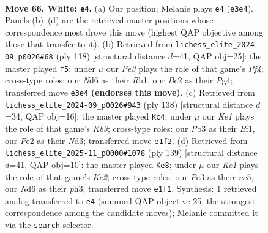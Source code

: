\documentclass[11pt]{article}
\begin{document}
\clearpage

\begin{figure}[p]\centering
\begin{subfigure}{0.46\textwidth}\centering
\resizebox{\linewidth}{!}{%
\newchessgame
\chessboard[
  setfen={n7/3n2k1/1b1N4/p2p4/P7/1P2P2p/2B1P3/4K3 w - - 1 66},
  showmover=false,
  pgfstyle=straightmove, color=movearrow, markmove={e3-e4}
]}
\caption{}
\end{subfigure}\hfill
\begin{subfigure}{0.46\textwidth}\centering
\resizebox{\linewidth}{!}{%
\newchessgame
\chessboard[
  setfen={8/2nk1pp1/3b4/1p4P1/1P2KPP1/2P5/8/7R w - - 18 60},
  showmover=false,
  pgfstyle=straightmove, color=movearrow, markmove={f4-f5}
]}
\caption{}
\end{subfigure}
\\[4pt]
\begin{subfigure}{0.46\textwidth}\centering
\resizebox{\linewidth}{!}{%
\newchessgame
\chessboard[
  setfen={8/2k5/p1pbp3/P5n1/1P1P3p/1K1NP3/8/5B2 w - - 10 70},
  showmover=false,
  pgfstyle=straightmove, color=movearrow, markmove={b3-c4}
]}
\caption{}
\end{subfigure}\hfill
\begin{subfigure}{0.46\textwidth}\centering
\resizebox{\linewidth}{!}{%
\newchessgame
\chessboard[
  setfen={8/2b1k3/4p3/1n1bN1pp/N3p3/6PP/1B3P2/6K1 b - - 5 70},
  showmover=false,
  pgfstyle=straightmove, color=movearrow, markmove={e7-e8}
]}
\caption{}
\end{subfigure}
\caption{\textbf{Move 66, White: \texttt{e4}.} (a) Our position; Melanie plays \texttt{e4} (\texttt{e3e4}). Panels (b)--(d) are the retrieved master positions whose correspondence most drove this move (highest QAP objective among those that transfer to it). (b) Retrieved from \texttt{lichess\_elite\_2024-09\_p0026\#68} (ply 118) [structural distance $d$=41, QAP obj=25]: the master played \texttt{f5}; under $\mu$ our \emph{Pe3} plays the role of that game's \emph{Pf4}; cross-type roles: our \emph{N}d6 as their \emph{R}h1, our \emph{B}c2 as their \emph{P}g4; transferred move \texttt{e3e4} \textbf{(endorses this move)}. (c) Retrieved from \texttt{lichess\_elite\_2024-09\_p0026\#943} (ply 138) [structural distance $d$=34, QAP obj=16]: the master played \texttt{Kc4}; under $\mu$ our \emph{Ke1} plays the role of that game's \emph{Kb3}; cross-type roles: our \emph{P}b3 as their \emph{B}f1, our \emph{P}e2 as their \emph{N}d3; transferred move \texttt{e1f2}. (d) Retrieved from \texttt{lichess\_elite\_2025-11\_p0000\#1078} (ply 139) [structural distance $d$=41, QAP obj=10]: the master played \texttt{Ke8}; under $\mu$ our \emph{Ke1} plays the role of that game's \emph{Ke2}; cross-type roles: our \emph{P}e3 as their \emph{n}e5, our \emph{N}d6 as their \emph{p}h3; transferred move \texttt{e1f1}. Synthesis: 1 retrieved analog transferred to \texttt{e4} (summed QAP objective 25, the strongest correspondence among the candidate moves); Melanie committed it via the \texttt{search} selector.}
\label{fig:thought-m130}
\end{figure}
\end{document}
